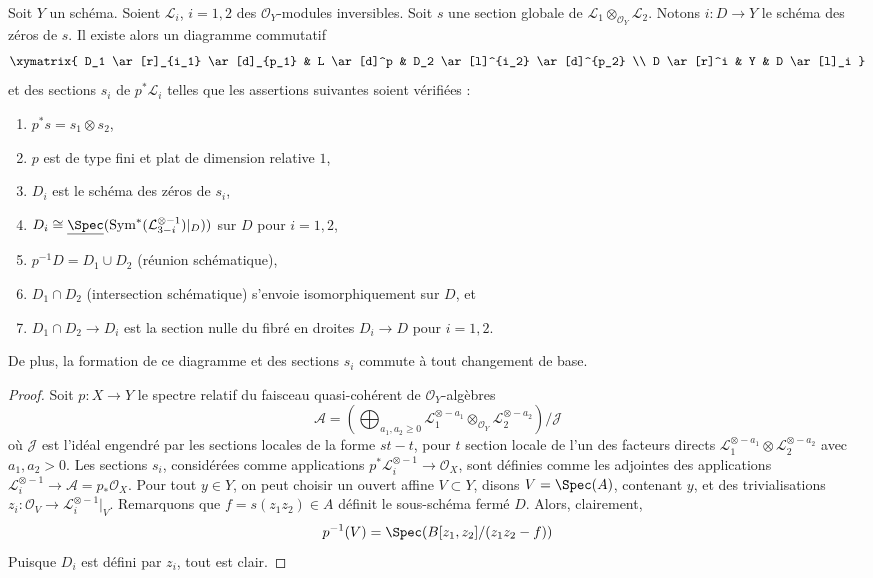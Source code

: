 \begin{lemma}
\label{lemma-decompose-section}
Soit $Y$ un schéma. Soient $\mathcal{L}_i$, $i = 1, 2$ des
$\mathcal{O}_Y$-modules inversibles. Soit $s$ une section globale de
$\mathcal{L}_1 \otimes_{\mathcal{O}_Y} \mathcal{L}_2$.
Notons $i : D \to Y$ le schéma des zéros de $s$.
Il existe alors un diagramme commutatif
$$
\xymatrix{
D_1 \ar[r]_{i_1} \ar[d]_{p_1} &
L \ar[d]^p &
D_2 \ar[l]^{i_2} \ar[d]^{p_2} \\
D \ar[r]^i &
Y &
D \ar[l]_i
}
$$
et des sections $s_i$ de $p^*\mathcal{L}_i$ telles que
les assertions suivantes soient vérifiées :
\begin{enumerate}
\item $p^*s = s_1 \otimes s_2$,
\item $p$ est de type fini et plat de dimension relative $1$,
\item $D_i$ est le schéma des zéros de $s_i$,
\item $D_i \cong
\underline{\Spec}(\text{Sym}^*(\mathcal{L}_{3 - i}^{\otimes -1})|_D))$
sur $D$ pour $i = 1, 2$,
\item $p^{-1}D = D_1 \cup D_2$ (réunion schématique),
\item $D_1 \cap D_2$ (intersection schématique) s'envoie
isomorphiquement sur $D$, et
\item $D_1 \cap D_2 \to D_i$
est la section nulle du fibré en droites $D_i \to D$ pour $i = 1, 2$.
\end{enumerate}
De plus, la formation de ce diagramme et des sections $s_i$
commute à tout changement de base.
\end{lemma}

\begin{proof}
Soit $p : X \to Y$ le spectre relatif du faisceau quasi-cohérent
de $\mathcal{O}_Y$-algèbres
$$
\mathcal{A} =
\left(\bigoplus\nolimits_{a_1, a_2 \geq 0}
\mathcal{L}_1^{\otimes -a_1} \otimes_{\mathcal{O}_Y}
\mathcal{L}_2^{\otimes -a_2}\right)/\mathcal{J}
$$
où $\mathcal{J}$ est l'idéal engendré par les sections locales de
la forme $st - t$, pour $t$ section locale de l'un des facteurs directs
$\mathcal{L}_1^{\otimes -a_1} \otimes \mathcal{L}_2^{\otimes -a_2}$
avec $a_1, a_2 > 0$. Les sections $s_i$, considérées comme applications
$p^*\mathcal{L}_i^{\otimes -1} \to \mathcal{O}_X$, sont définies comme les adjointes
des applications $\mathcal{L}_i^{\otimes -1} \to \mathcal{A} = p_*\mathcal{O}_X$.
Pour tout $y \in Y$, on peut choisir un
ouvert affine $V \subset Y$, disons $V = \Spec(A)$, contenant $y$, et des
trivialisations $z_i : \mathcal{O}_V \to \mathcal{L}_i^{\otimes -1}|_V$.
Remarquons que $f = s(z_1z_2) \in A$ définit le sous-schéma fermé $D$.
Alors, clairement,
$$
p^{-1}(V) = \Spec(B[z_1, z_2]/(z_1 z_2 - f))
$$
Puisque $D_i$ est défini par $z_i$, tout est clair.
\end{proof}

